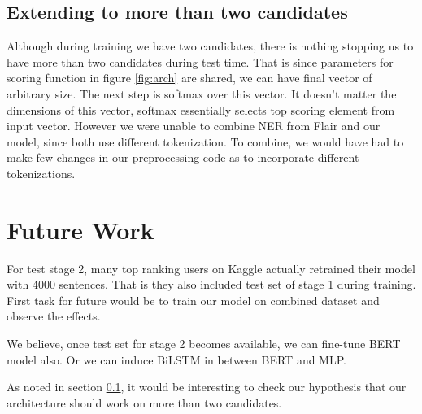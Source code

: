 \documentclass[11pt,a4paper]{article}
\begin{document}
\subsection{Extending to more than two candidates}
\label{subsec:morecandidates}
Although during training we have two candidates, there is nothing stopping us to have more than two candidates during test time. That is since parameters for scoring function in figure \ref{fig:arch} are shared, we can have final vector of arbitrary size. The next step is softmax over this vector. It doesn't matter the dimensions of this vector, softmax essentially selects top scoring element from input vector. However we were unable to combine NER from Flair and our model, since both use different tokenization. To combine, we would have had to make few changes in our preprocessing code as to incorporate different tokenizations.

\section{Future Work}
For test stage 2, many top ranking users on Kaggle actually retrained their model with 4000 sentences. That is they also included test set of stage 1 during training. First task for future would be to train our model on combined dataset and observe the effects.

We believe, once test set for stage 2 becomes available, we can fine-tune BERT model also. Or we can induce BiLSTM in between BERT and MLP.

As noted in section \ref{subsec:morecandidates}, it would be interesting to check our hypothesis that our architecture should work on more than two candidates.




\end{document}
